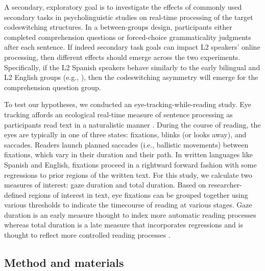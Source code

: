 \documentclass[output=paper,colorlinks,citecolor=brown]{langscibook}
\begin{document}
A secondary, exploratory goal is to investigate the effects of commonly used secondary tasks in psycholinguistic studies on real-time processing of the target codeswitching structures. In a between-groups design, participants either completed comprehension questions or forced-choice grammaticality judgments after each sentence. If indeed secondary task goals can impact L2 speakers' online processing, then different effects should emerge across the two experiments. Specifically, if the L2 Spanish speakers behave similarly to the early bilingual and L2 English groups (e.g., \cite{ValdesKroffetal2018}), then the codeswitching asymmetry will emerge for the comprehension question group.

To test our hypotheses, we conducted an eye-tracking-while-reading study. Eye tracking affords an ecological real-time measure of sentence processing as participants read text in a naturalistic manner \citep{ValdesKroffetal2018}. During the course of reading, the eyes are typically in one of three states: fixations, blinks (or looks away), and saccades. Readers launch planned saccades (i.e., ballistic movements) between fixations, which vary in their duration and their path. In written languages like Spanish and English, fixations proceed in a rightward forward fashion with some regressions to prior regions of the written text.  For this study, we calculate two measures of interest: gaze duration and total duration.  Based on researcher-defined regions of interest in text, eye fixations can be grouped together using various thresholds to indicate the timecourse of reading at various stages. Gaze duration is an early measure thought to index more automatic reading processes whereas total duration is a late measure that incorporates regressions and is thought to reflect more controlled reading processes \citep{Rayner1998,Godfroid2019}.

\subsection{Method and materials}
\end{document}
